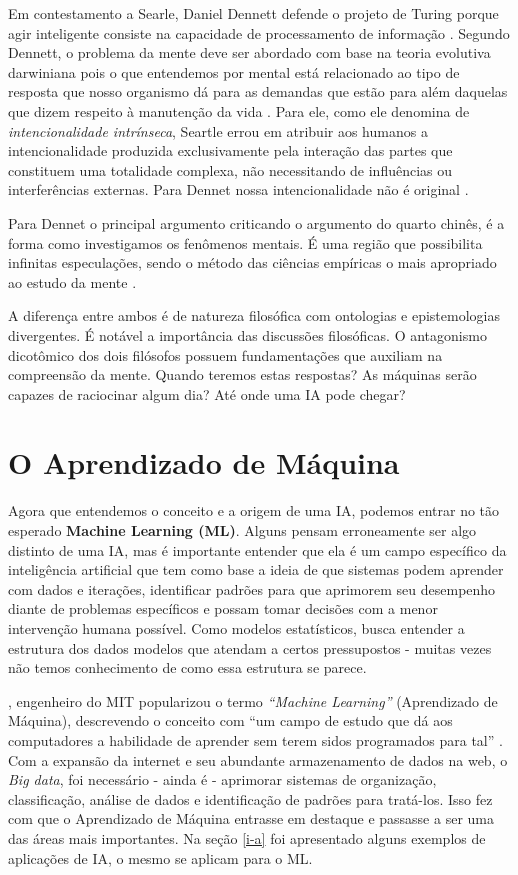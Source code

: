 \documentclass[
]{book}
\begin{document}
Em contestamento a Searle, Daniel Dennett defende o projeto de Turing porque agir inteligente consiste na capacidade de processamento de informação \citep{dennett2009part}. Segundo Dennett, o problema da mente deve ser abordado com base na teoria evolutiva darwiniana pois o que entendemos por mental está relacionado ao tipo de resposta que nosso organismo dá para as demandas que estão para além daquelas que dizem respeito à manutenção da vida \citep{da2013searle}. Para ele, como ele denomina de \emph{intencionalidade intrínseca}, Seartle errou em atribuir aos humanos a intencionalidade produzida exclusivamente pela interação das partes que constituem uma totalidade complexa, não necessitando de influências ou interferências externas. Para Dennet nossa intencionalidade não é original \citep{dennett2009part}.

Para Dennet o principal argumento criticando o argumento do quarto chinês, é a forma como investigamos os fenômenos mentais. É uma região que possibilita infinitas especulações, sendo o método das ciências empíricas o mais apropriado ao estudo da mente \citep{da2013searle}.

A diferença entre ambos é de natureza filosófica com ontologias e epistemologias divergentes. É notável a importância das discussões filosóficas. O antagonismo dicotômico dos dois filósofos possuem fundamentações que auxiliam na compreensão da mente. Quando teremos estas respostas? As máquinas serão capazes de raciocinar algum dia? Até onde uma IA pode chegar?

\hypertarget{machinelearning}{%
\chapter{O Aprendizado de Máquina}\label{machinelearning}}

Agora que entendemos o conceito e a origem de uma IA, podemos entrar no tão esperado \textbf{Machine Learning (ML)}. Alguns pensam erroneamente ser algo distinto de uma IA, mas é importante entender que ela é um campo específico da inteligência artificial que tem como base a ideia de que sistemas podem aprender com dados e iterações, identificar padrões para que aprimorem seu desempenho diante de problemas específicos e possam tomar decisões com a menor intervenção humana possível. Como modelos estatísticos, busca entender a estrutura dos dados modelos que atendam a certos pressupostos - muitas vezes não temos conhecimento de como essa estrutura se parece.

\citet{samuel1959some}, engenheiro do MIT popularizou o termo \emph{``Machine Learning''} (Aprendizado de Máquina), descrevendo o conceito com ``um campo de estudo que dá aos computadores a habilidade de aprender sem terem sidos programados para tal'' \citep{simon2013too}. Com a expansão da internet e seu abundante armazenamento de dados na web, o \emph{Big data}, foi necessário - ainda é - aprimorar sistemas de organização, classificação, análise de dados e identificação de padrões para tratá-los. Isso fez com que o Aprendizado de Máquina entrasse em destaque e passasse a ser uma das áreas mais importantes. Na seção \ref{i-a} foi apresentado alguns exemplos de aplicações de IA, o mesmo se aplicam para o ML.
\end{document}
